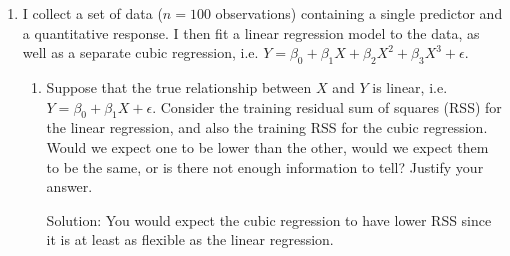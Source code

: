 \documentclass{article}
\begin{document}
\begin{enumerate}
\begin{enumerate}
         average than high school graduates provided that the GPA is high 
         enough.

Solution: The model is:

$y = \beta_0 + \beta_1 \cdot \text{GPA} + \beta_2 \cdot \text{IQ} + \beta_3 \cdot \text{Level} + \beta_4 \cdot \text{GPA} \cdot \text{IQ} + \beta_5 \cdot \text{GPA} \cdot \text{Level}$

Fixing IQ and GPA, changing Level from 0 to 1 will change the outcome by:

$\Delta y = \beta_3 + \beta_5 \cdot \text{GPA}$

$\Delta y > 0 \Rightarrow \beta_3 + \beta_5 \cdot \text{GPA} > 0 \Rightarrow \text{GPA} < \dfrac{-\beta_3}{\beta_5} = \dfrac{-35}{-10} = 3.5$

Option iii correct.

\item Predict the salary of a college graduate with IQ of 110 and a GPA of 4.0.

\item True or false: Since the coefficient for the GPA/IQ interaction term is
    very small, there is very little evidence of an interaction effect. Justify
    your answer.

Solution: This is false. It is important to remember that GPA and IQ vary over different
scales. It is better to explicitly test the significance of the interaction 
effect, and/or visualize or quantify the effect on sales under realistic ranges
of GPA/IQ values.
\end{enumerate}

\item I collect a set of data ($n = 100$ observations) containing a single predictor
 and a quantitative response. I then fit a linear regression model to the data,
 as well as a separate cubic regression, i.e. $Y = \beta_0 + \beta_1X +
 \beta_2X^2 + \beta_3X^3 + \epsilon$.

\begin{enumerate}
\item Suppose that the true relationship between $X$ and $Y$ is linear,
    i.e. $Y = \beta_0 + \beta_1X + \epsilon$. Consider the training residual
    sum of squares (RSS) for the linear regression, and also the training RSS
    for the cubic regression. Would we expect one to be lower than the other,
    would we expect them to be the same, or is there not enough information to
    tell? Justify your answer.

Solution: You would expect the cubic regression to have lower RSS since it is at least
as flexible as the linear regression.


\end{enumerate}
\end{enumerate}
\end{document}
